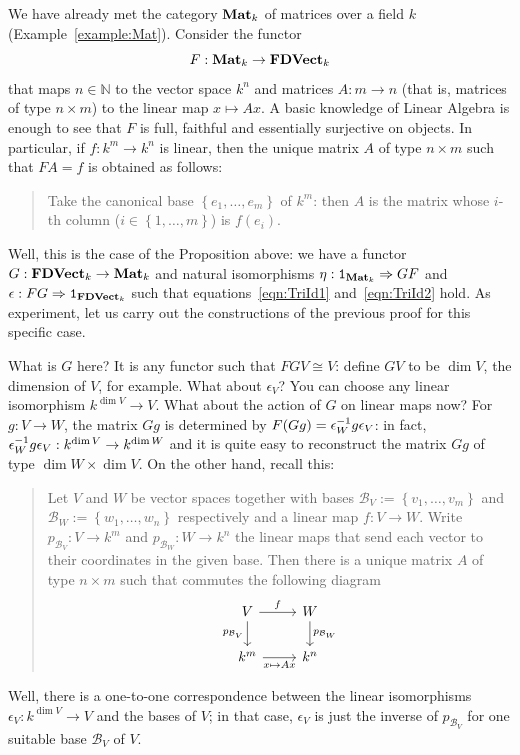 \begin{example}
  We have already met the category \(\mathbf{Mat}_k\) of matrices over a field
  \(k\) (Example~\ref{example:Mat}). Consider the functor
  \[
    F : \mathbf{Mat}_k \to \mathbf{FDVect}_k
  \]
  that maps \(n \in \mathbb{N}\) to the vector space \(k^n\) and matrices
  \(A : m \to n\) (that is, matrices of type \(n \times m\)) to the linear map
  \(x \mapsto Ax\). A basic knowledge of {\sc Linear Algebra} is enough to see
  that \(F\) is full, faithful and essentially surjective on objects. In
  particular, if \(f : k^m \to k^n\) is linear, then the unique matrix
  \(A\) of type \(n \times m\) such that \(FA = f\) is obtained as follows:
  \begin{quote}
    Take the canonical base \(\left\{ e_1, \dots, e_m \right\}\) of
    \(k^m\): then \(A\) is the matrix whose \(i\)-th column
    (\(i \in \left\{ 1, \dots, m \right\}\)) is \(f(e_i)\).
  \end{quote}
  Well, this is the case of the Proposition above: we have a functor
  \(G : \mathbf{FDVect}_k \to \mathbf{Mat}_k\) and natural isomorphisms
  \(\eta : \mathtt 1_{\mathbf{Mat}_k} \Rightarrow GF\) and
  \(\epsilon : FG \Rightarrow \mathtt 1_{\mathbf{FDVect}_k}\) such that equations~\eqref{eqn:TriId1}
  and~\eqref{eqn:TriId2} hold. As experiment, let us carry out the
  constructions of the previous proof for this specific case.

  What is \(G\) here? It is any functor such that \(FGV \cong V\): define
  \(GV\) to be \(\dim V\), the dimension of \(V\), for example. What
  about \(\epsilon_V\)? You can choose any linear isomorphism
  \(k^{\dim V} \to V\). What about the action of \(G\) on linear maps now?
  For \(g : V \to W\), the matrix \(Gg\) is determined by
  \(F(G g) = \epsilon^{-1}_W g \epsilon_V\): in fact,
  \(\epsilon^{-1}_W g \epsilon_V : k^{\dim V} \to k^{\dim W}\) and it is quite easy to
  reconstruct the matrix \(Gg\) of type \(\dim W \times \dim V\). On the
  other hand, recall this:
  \begin{quote}
    Let \(V\) and \(W\) be vector spaces together with bases
    \(\mathcal{B}_V := \left\{ v_1, \dots, v_m\right\}\) and
    \(\mathcal{B}_W := \left\{ w_1, \dots, w_n\right\}\) respectively and a linear
    map \(f : V \to W\). Write \(p_{\mathcal{B}_V} : V \to k^m\) and
    \(p_{\mathcal{B}_W} : W \to k^n\) the linear maps that send each vector to their
    coordinates in the given base. Then there is a unique matrix \(A\)
    of type \(n \times m\) such that commutes the following diagram
    \[
      \begin{tikzcd}
        V \ar["{p_{\mathcal{B}_V}}", d, swap] \ar["{f}", r] & W \ar["{p_{\mathcal{B}_W}}", d] \\
        k^m \ar["{x \mapsto Ax}", r, swap] & k^n
      \end{tikzcd}
    \]
  \end{quote}
  Well, there is a one-to-one correspondence between the linear
  isomorphisms \(\epsilon_V : k^{\dim V} \to V\) and the bases of \(V\); in that
  case, \(\epsilon_V\) is just the inverse of \(p_{\mathcal{B}_V}\) for one suitable base
  \(\mathcal{B}_V\) of \(V\).


\end{example}
